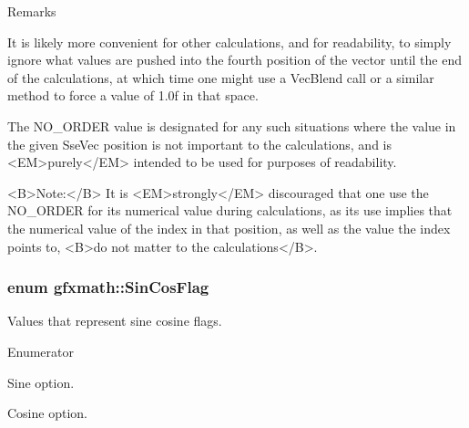 \begin{Desc}
\begin{description}
\begin{DoxyRemark}{Remarks}
\begin{DoxyVerb}
           It is likely more convenient for other calculations, and for readability, to simply ignore what
           values are pushed into the fourth position of the vector until the end of the calculations, at
           which time one might use a VecBlend call or a similar method to force a value of 1.0f in that
           space.

           The NO_ORDER value is designated for any such situations where the value in the given SseVec position
           is not important to the calculations, and is <EM>purely</EM> intended to be used for purposes of
           readability.

           <B>Note:</B> It is <EM>strongly</EM> discouraged that one use the NO_ORDER for its numerical value during calculations,
           as its use implies that the numerical value of the index in that position, as well as the value the index points
           to, <B>do not matter to the calculations</B>.\end{DoxyVerb}
 
\end{DoxyRemark}
\end{description}
\end{Desc}
\hypertarget{namespacegfxmath_ac97be114298a04e9db7f993085667b00}{}
\subsubsection[{Sin\+Cos\+Flag}]{\setlength{\rightskip}{0pt plus 5cm}enum {\bf gfxmath\+::\+Sin\+Cos\+Flag}}\label{namespacegfxmath_ac97be114298a04e9db7f993085667b00}


Values that represent sine cosine flags. 

\begin{Desc}
\item[Enumerator]\par
\begin{description}
\item[{\em 
\hypertarget{namespacegfxmath_ac97be114298a04e9db7f993085667b00ac25dc94e5f333f4dc6ead2b93687bfcc}{}S\+I\+N\label{namespacegfxmath_ac97be114298a04e9db7f993085667b00ac25dc94e5f333f4dc6ead2b93687bfcc}
}]Sine option. \item[{\em 
\hypertarget{namespacegfxmath_ac97be114298a04e9db7f993085667b00a46197a43f8fe8efbdae8c2670975d2e7}{}C\+O\+S\label{namespacegfxmath_ac97be114298a04e9db7f993085667b00a46197a43f8fe8efbdae8c2670975d2e7}
}]Cosine option. \end{description}
\end{Desc}
\hypertarget{namespacegfxmath_a8930e63e96e91796ede30a8378b19d0b}{}
